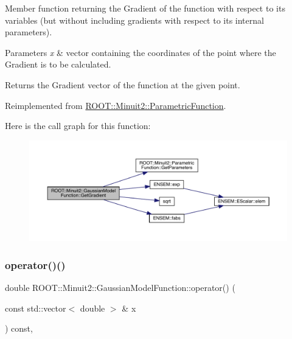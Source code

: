 Member function returning the Gradient of the function with respect to its variables (but without including gradients with respect to its internal parameters).


\begin{DoxyParams}{Parameters}
{\em x} & vector containing the coordinates of the point where the Gradient is to be calculated.\\
\hline
\end{DoxyParams}
\begin{DoxyReturn}{Returns}
the Gradient vector of the function at the given point. 
\end{DoxyReturn}


Reimplemented from \mbox{\hyperlink{classROOT_1_1Minuit2_1_1ParametricFunction_abe6cfa5c64c578101da1d6fcecfb2249}{R\+O\+O\+T\+::\+Minuit2\+::\+Parametric\+Function}}.

Here is the call graph for this function\+:\nopagebreak
\begin{figure}[H]
\begin{center}
\leavevmode
\includegraphics[width=350pt]{d4/df6/classROOT_1_1Minuit2_1_1GaussianModelFunction_ac81a3c5531a291b8a9c3af533de07195_cgraph}
\end{center}
\end{figure}
\mbox{\label{classROOT_1_1Minuit2_1_1GaussianModelFunction_af4102c5eecd496d63c5592f7519248ce}} 
\subsubsection{\texorpdfstring{operator()()}{operator()()}\hspace{0.1cm}{\footnotesize\ttfamily [1/2]}}
{\footnotesize\ttfamily double R\+O\+O\+T\+::\+Minuit2\+::\+Gaussian\+Model\+Function\+::operator() (\begin{DoxyParamCaption}\item[{const std\+::vector$<$ double $>$ \&}]{x }\end{DoxyParamCaption}) const\hspace{0.3cm}{\ttfamily [inline]}, {\ttfamily [virtual]}}


